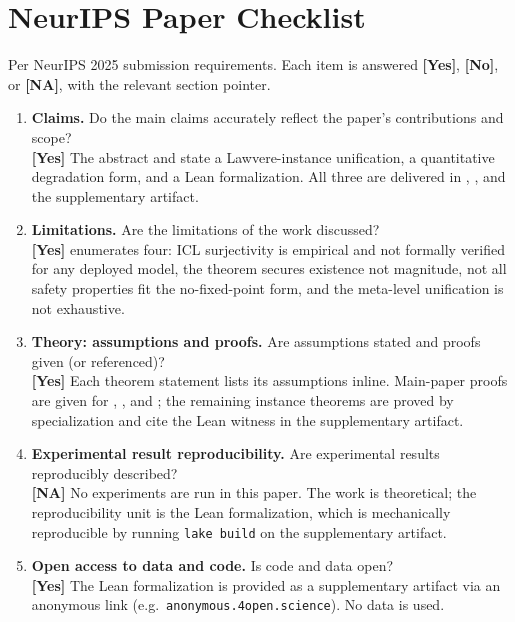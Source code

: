 \section*{NeurIPS Paper Checklist}
\label{sec:checklist}

Per NeurIPS 2025 submission requirements. Each item is answered \textbf{[Yes]}, \textbf{[No]}, or \textbf{[NA]}, with the relevant section pointer.

\begin{enumerate}[leftmargin=1.9em,itemsep=0.25em]

\item \textbf{Claims.} Do the main claims accurately reflect the paper's contributions and scope?\\
\textbf{[Yes]} The abstract and  state a Lawvere-instance unification, a quantitative degradation form, and a Lean formalization. All three are delivered in , , and the supplementary artifact.

\item \textbf{Limitations.} Are the limitations of the work discussed?\\
\textbf{[Yes]}  enumerates four: ICL surjectivity is empirical and not formally verified for any deployed model, the theorem secures existence not magnitude, not all safety properties fit the no-fixed-point form, and the meta-level unification is not exhaustive.

\item \textbf{Theory: assumptions and proofs.} Are assumptions stated and proofs given (or referenced)?\\
\textbf{[Yes]} Each theorem statement lists its assumptions inline. Main-paper proofs are given for , , and ; the remaining instance theorems are proved by specialization and cite the Lean witness in the supplementary artifact.

\item \textbf{Experimental result reproducibility.} Are experimental results reproducibly described?\\
\textbf{[NA]} No experiments are run in this paper. The work is theoretical; the reproducibility unit is the Lean formalization, which is mechanically reproducible by running \texttt{lake build} on the supplementary artifact.

\item \textbf{Open access to data and code.} Is code and data open?\\
\textbf{[Yes]} The Lean formalization is provided as a supplementary artifact via an anonymous link (e.g.\ \texttt{anonymous.4open.science}). No data is used.


\end{enumerate}
